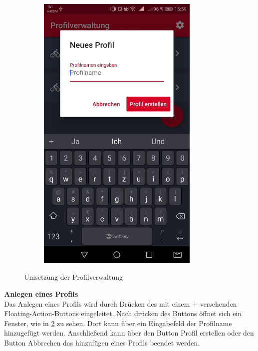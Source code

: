 \begin{figure}[H]
\begin{subfigure}[b]{0.45\textwidth}
			\label{subfig:profil}
		\end{subfigure}
		\hfill
		\begin{subfigure}[b]{0.45\textwidth}
			\includegraphics[width=0.85\textwidth]{../include/images/funktionalitaet/profil_eingabe}
			\label{subfig:profil_eingabe}
		\end{subfigure}
		\caption{Umsetzung der Profilverwaltung}
		\label{img:settings}
	\end{figure}
	
	\textbf{Anlegen eines Profils}\\
	Das Anlegen eines Profils wird durch Drücken des mit einem \glqq +\grqq{} versehenden Floating-Action-Buttons eingeleitet. Nach drücken des Buttons öffnet sich ein Fenster, wie in \cref{subfig:profil_eingabe} zu sehen. Dort kann über ein Eingabefeld der Profilname hinzugefügt werden. Anschließend kann über den Button \glqq Profil erstellen\grqq{} oder den Button \glqq Abbrechen\grqq{} das hinzufügen eines Profils beendet werden.\\
	
